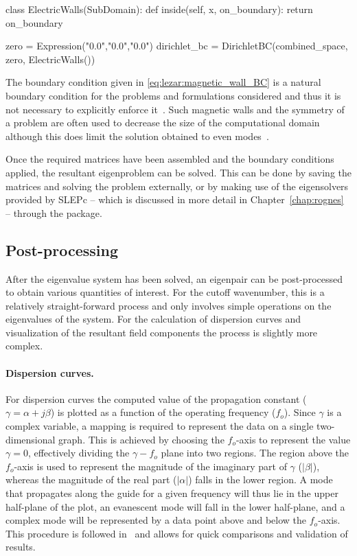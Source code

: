 \begin{python}
class ElectricWalls(SubDomain):
    def inside(self, x, on_boundary):
        return on_boundary

zero = Expression("0.0","0.0","0.0")
dirichlet_bc = DirichletBC(combined_space, zero, ElectricWalls())
\end{python}

The boundary condition given in \eqref{eq:lezar:magnetic_wall_BC}
is a natural boundary condition for the problems and formulations
considered and thus it is not necessary to explicitly enforce
it~\citep{PelosiCoccioliSelleri1998}. Such magnetic walls and the
symmetry of a problem are often used to decrease the size of the
computational domain although this does limit the solution obtained to
even modes~\citep{Jin2002}.

Once the required matrices have been assembled and the boundary conditions
applied, the resultant eigenproblem can be solved. This can be done by
saving the matrices and solving the problem externally, or by making
use of the eigensolvers provided by SLEPc -- which is discussed in more
detail in Chapter~\ref{chap:rognes} -- through the \fenics{} package.

\subsection{Post-processing}

After the eigenvalue system has been solved, an eigenpair can
be post-processed to obtain various quantities of interest. For the
cutoff wavenumber, this is a relatively
straight-forward process and only involves simple operations on the
eigenvalues of the system. For the calculation of dispersion curves
and visualization of the resultant field components the process is
slightly more complex.

\paragraph{Dispersion curves.}

For dispersion curves the computed value of the propagation constant
($\gamma = \alpha + j\beta$) is plotted as a function of the operating
frequency ($f_o$). Since $\gamma$ is a complex variable, a mapping is
required to represent the data on a single two-dimensional graph. This
is achieved by choosing the $f_o$-axis to represent the value $\gamma
= 0$, effectively dividing the {$\gamma-f_o$} plane into two
regions. The region above the $f_o$-axis is used to represent the
magnitude of the imaginary part of $\gamma$ ($|\beta|$), whereas the
magnitude of the real part ($|\alpha|$) falls in the lower region. A
mode that propagates along the guide for a given frequency will thus
lie in the upper half-plane of the plot, an evanescent mode will fall
in the lower half-plane, and a complex mode will be represented by a
data point above and below the $f_o$-axis.  This procedure is followed
in~\citet{PelosiCoccioliSelleri1998} and allows for quick comparisons
and validation of results.

